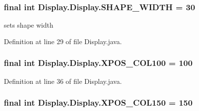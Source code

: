 \hypertarget{class_display_1_1_display_a98ff51285260ae5d3e0bf9a640385605}{}
\subsubsection[{S\+H\+A\+P\+E\+\_\+\+W\+I\+D\+T\+H}]{\setlength{\rightskip}{0pt plus 5cm}final int Display.\+Display.\+S\+H\+A\+P\+E\+\_\+\+W\+I\+D\+T\+H = 30\hspace{0.3cm}{\ttfamily [private]}}\label{class_display_1_1_display_a98ff51285260ae5d3e0bf9a640385605}
sets shape width 

Definition at line 29 of file Display.\+java.

\hypertarget{class_display_1_1_display_a0a8b9027490d3aa7d66834c6c12c0d35}{}
\subsubsection[{X\+P\+O\+S\+\_\+\+C\+O\+L100}]{\setlength{\rightskip}{0pt plus 5cm}final int Display.\+Display.\+X\+P\+O\+S\+\_\+\+C\+O\+L100 = 100\hspace{0.3cm}{\ttfamily [static]}}\label{class_display_1_1_display_a0a8b9027490d3aa7d66834c6c12c0d35}


Definition at line 36 of file Display.\+java.

\hypertarget{class_display_1_1_display_abc29a83a5afef24b6775c0c867d5ca2e}{}
\subsubsection[{X\+P\+O\+S\+\_\+\+C\+O\+L150}]{\setlength{\rightskip}{0pt plus 5cm}final int Display.\+Display.\+X\+P\+O\+S\+\_\+\+C\+O\+L150 = 150\hspace{0.3cm}{\ttfamily [static]}}\label{class_display_1_1_display_abc29a83a5afef24b6775c0c867d5ca2e}


